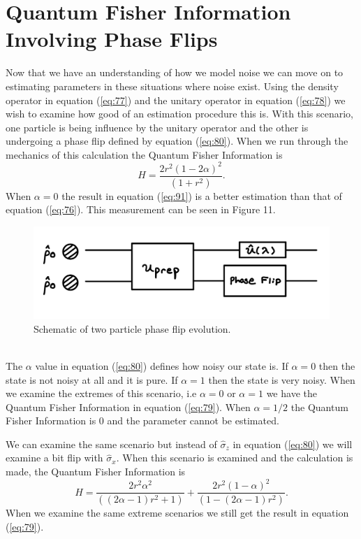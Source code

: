 \documentclass[twocolumn]{article}
\begin{document}
\section*{Quantum Fisher Information Involving Phase Flips}
Now that we have an understanding of how we model noise we can move on to estimating parameters in these situations where noise exist. Using the density operator in equation (\ref{eq:77}) and the unitary operator in equation (\ref{eq:78}) we wish to examine how good of an estimation procedure this is. With this scenario, one particle is being influence by the unitary operator and the other is undergoing a phase flip defined by equation (\ref{eq:80}). When we run through the mechanics of this calculation the Quantum Fisher Information is
\begin{equation}\label{eq:91}
H=\frac{2r^2(1-2\alpha)^2}{(1+r^2)}.
\end{equation}
When $\alpha=0$ the result in equation (\ref{eq:91}) is a better estimation than that of equation (\ref{eq:76}). This measurement can be seen in Figure 11.
\begin{figure}[htpb]
\begin{center}
\includegraphics[width=0.90\linewidth]{Two-Particle-Phase-Flip.jpg}
\caption{Schematic of two particle phase flip evolution.}
\end{center}
\end{figure}\\
The $\alpha$ value in equation (\ref{eq:80}) defines how noisy our state is. If $\alpha=0$ then the state is not noisy at all and it is pure. If $\alpha=1$ then the state is very noisy. When we examine the extremes of this scenario, i.e $\alpha=0$ or $\alpha=1$ we have the Quantum Fisher Information in equation (\ref{eq:79}). When $\alpha=1/2$ the Quantum Fisher Information is 0 and the parameter cannot be estimated.

We can examine the same scenario but instead of $\hat{\sigma}_z$ in equation (\ref{eq:80}) we will examine a bit flip with $\hat{\sigma}_x$. When this scenario is examined and the calculation is made, the Quantum Fisher Information is
\begin{equation}\label{eq:92}
H=\frac{2r^2\alpha^2}{((2\alpha-1)r^2+1)}+\frac{2r^2(1-\alpha)^2}{(1-(2\alpha-1)r^2)}.
\end{equation}
When we examine the same extreme scenarios we still get the result in equation (\ref{eq:79}).
\end{document}
